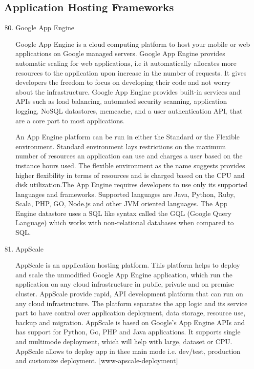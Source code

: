 \subsection{Application Hosting Frameworks}
\label{\detokenize{i524/technologies:application-hosting-frameworks}}\begin{enumerate}
\setcounter{enumi}{79}
\item {} 
Google App Engine

Google App Engine is a cloud computing platform to host your
mobile or web applications on Google managed servers. Google App
Engine provides automatic scaling for web applications, i.e it
automatically allocates more resources to the application upon
increase in the number of requests. It gives developers the
freedom to focus on developing their code and not worry about the
infrastructure. Google App Engine provides built-in services and
APIs such as load balancing, automated security scanning,
application logging, NoSQL datastores, memcache, and a user
authentication API, that are a core part to most
applications. \label{\detokenize{i524/technologies:id160}}{\hyperref[\detokenize{i524/technologies:www-appengine-google}]{\sphinxcrossref{{[}141{]}}}}

An App Engine platform can be run in either the Standard or the
Flexible environment. Standard environment lays restrictions on
the maximum number of resources an application can use and charges
a user based on the instance hours used. The flexible environment
as the name suggests provides higher flexibility in terms of
resources and is charged based on the CPU and disk utilization.The
App Engine requires developers to use only its supported languages
and frameworks. Supported languages are Java, Python, Ruby, Scala,
PHP, GO, Node.js and other JVM oriented languages. The App Engine
datastore uses a SQL like syntax called the GQL (Google Query
Language) which works with non-relational databases when compared
to SQL. \label{\detokenize{i524/technologies:id161}}{\hyperref[\detokenize{i524/technologies:www-wiki-appengine}]{\sphinxcrossref{{[}142{]}}}}

\item {} 
AppScale

AppScale is an application hosting platform. This platform helps
to deploy and scale the unmodified Google App Engine application,
which run the application on any cloud infrastructure in public,
private and on premise cluster. \label{\detokenize{i524/technologies:id162}}{\hyperref[\detokenize{i524/technologies:www-appscale}]{\sphinxcrossref{{[}143{]}}}} AppScale
provide rapid, API development platform that can run on any cloud
infrastructure. The platform separates the app logic and its
service part to have control over application deployment, data
storage, resource use, backup and migration.  AppScale is based on
Google’s App Engine APIs and has support for Python, Go, PHP and
Java applications. It supports single and multimode deployment,
which will help with large, dataset or CPU. AppScale allows to
deploy app in thee main mode i.e. dev/test, production and
customize deployment.  {[}www-apscale-deployment{]}


\end{enumerate}

